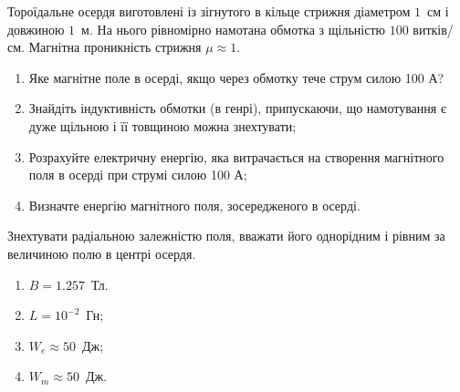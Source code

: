 \begin{problem}
    Тороїдальне осердя виготовлені із зігнутого в кільце стрижня діаметром $1$~см і довжиною $1$~м. На нього рівномірно намотана обмотка з щільністю $100$ витків/см. Магнітна проникність стрижня $\mu \approx 1$.
\begin{enumerate}[label=\alph*)]
	\item Яке магнітне поле в осерді, якщо через обмотку тече струм силою 100 А?
	\item Знайдіть індуктивність обмотки (в генрі), припускаючи, що намотування є дуже щільною і її товщиною можна знехтувати;
	\item Розрахуйте електричну енергію, яка витрачається на створення магнітного поля в осерді при струмі силою
	100 А;
	\item Визначте енергію магнітного поля, зосередженого в осерді.
\end{enumerate}
Знехтувати радіальною залежністю поля, вважати його однорідним і рівним за величиною полю в центрі осердя.
\begin{solution}
\begin{enumerate}[label=\alph*)]
	\item $B = 1.257$~Тл.
	\item $L = 10^{-2}$~Гн;
	\item $W_e \approx 50$~Дж;
	\item  $W_m \approx 50$~Дж.
\end{enumerate}
\end{solution}
\end{problem}



